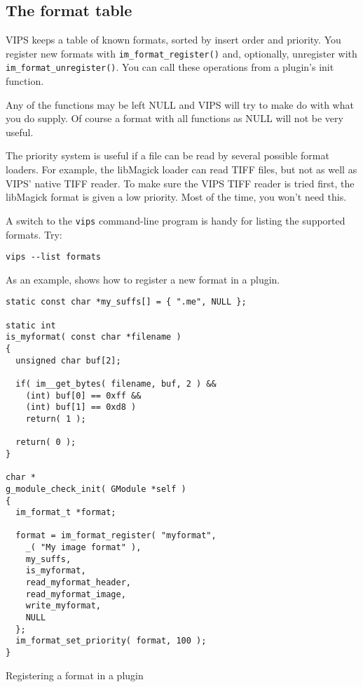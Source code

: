 \subsection{The format table}

VIPS keeps a table of known formats, sorted by insert order and priority. You
register new formats with \verb+im_format_register()+ and, optionally,
unregister with \verb+im_format_unregister()+. You can call these operations
from a plugin's init function.

Any of the functions may be left NULL and VIPS will try to make do with what
you do supply. Of course a format with all functions as NULL will not be very
useful.

The priority system is useful if a file can be read by several possible format
loaders. For example, the libMagick loader can read TIFF files, but not as
well as VIPS' native TIFF reader. To make sure the VIPS TIFF reader is tried
first, the libMagick format is given a low priority. Most of the time, you
won't need this.

A switch to the \verb+vips+ command-line program is handy for listing the
supported formats. Try:

\begin{verbatim}
vips --list formats
\end{verbatim}

As an example,  shows how to register a new format in a
plugin.

\begin{fig2}
\begin{verbatim}
static const char *my_suffs[] = { ".me", NULL };

static int
is_myformat( const char *filename )
{
  unsigned char buf[2];

  if( im__get_bytes( filename, buf, 2 ) &&
    (int) buf[0] == 0xff && 
    (int) buf[1] == 0xd8 )
    return( 1 );

  return( 0 );
}

char *
g_module_check_init( GModule *self )
{
  im_format_t *format;

  format = im_format_register( "myformat",
    _( "My image format" ),
    my_suffs,
    is_myformat,
    read_myformat_header,
    read_myformat_image,
    write_myformat,
    NULL
  };
  im_format_set_priority( format, 100 );
}
\end{verbatim}
\caption{Registering a format in a plugin}
\label{fg:newformat}
\end{fig2}

